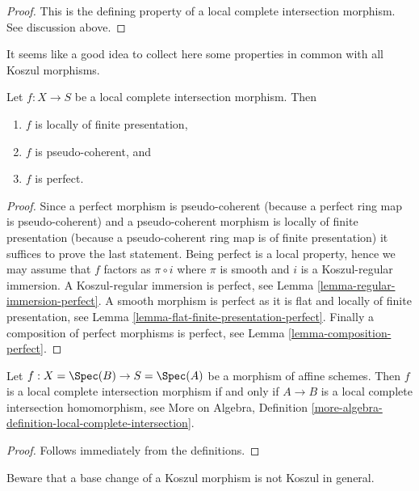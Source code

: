 \begin{proof}
This is the defining property of a local complete intersection
morphism. See discussion above.
\end{proof}

\noindent
It seems like a good idea to collect here some properties in common
with all Koszul morphisms.

\begin{lemma}
\label{lemma-lci-properties}
Let $f : X \to S$ be a local complete intersection morphism.
Then
\begin{enumerate}
\item $f$ is locally of finite presentation,
\item $f$ is pseudo-coherent, and
\item $f$ is perfect.
\end{enumerate}
\end{lemma}

\begin{proof}
Since a perfect morphism is pseudo-coherent
(because a perfect ring map is pseudo-coherent)
and a pseudo-coherent morphism is locally of finite presentation
(because a pseudo-coherent ring map is of finite presentation)
it suffices to prove the last statement. Being perfect is a local
property, hence we may assume that $f$ factors as $\pi \circ i$ where
$\pi$ is smooth and $i$ is a Koszul-regular immersion.
A Koszul-regular immersion is perfect, see
Lemma \ref{lemma-regular-immersion-perfect}.
A smooth morphism is perfect as it is flat and locally of finite
presentation, see
Lemma \ref{lemma-flat-finite-presentation-perfect}.
Finally a composition of perfect morphisms is perfect, see
Lemma \ref{lemma-composition-perfect}.
\end{proof}

\begin{lemma}
\label{lemma-affine-lci}
Let $f : X = \Spec(B) \to S = \Spec(A)$ be a morphism of affine schemes.
Then $f$ is a local complete intersection morphism if and only if
$A \to B$ is a local complete intersection homomorphism, see
More on Algebra, Definition
\ref{more-algebra-definition-local-complete-intersection}.
\end{lemma}

\begin{proof}
Follows immediately from the definitions.
\end{proof}

\noindent
Beware that a base change of a Koszul morphism is not
Koszul in general.

